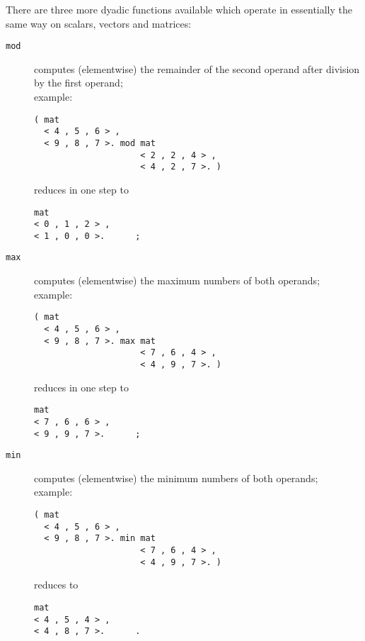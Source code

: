There are three more dyadic functions available which
operate in essentially the same 
way on scalars, vectors and matrices:
\begin{description} 
\item[{\tt mod}] computes (elementwise) the remainder of
the second operand after division by the first operand;
\\example:
\begin{verbatim}
( mat 
  < 4 , 5 , 6 > ,
  < 9 , 8 , 7 >. mod mat 
                     < 2 , 2 , 4 > ,
                     < 4 , 2 , 7 >. )
\end{verbatim}
reduces in one step to
\begin{verbatim}
mat 
< 0 , 1 , 2 > ,
< 1 , 0 , 0 >.      ;
\end{verbatim}
\item[{\tt max}] computes (elementwise) the maximum numbers
of both operands;
\\example:
\begin{verbatim}
( mat 
  < 4 , 5 , 6 > ,
  < 9 , 8 , 7 >. max mat 
                     < 7 , 6 , 4 > ,
                     < 4 , 9 , 7 >. )
\end{verbatim}
reduces in one step to
\begin{verbatim}
mat 
< 7 , 6 , 6 > ,
< 9 , 9 , 7 >.      ;
\end{verbatim}
\item[{\tt min}] computes (elementwise) the minimum numbers
of both operands;
\\example:
\begin{verbatim}
( mat 
  < 4 , 5 , 6 > ,
  < 9 , 8 , 7 >. min mat 
                     < 7 , 6 , 4 > ,
                     < 4 , 9 , 7 >. )
\end{verbatim}
reduces to
\begin{verbatim}
mat 
< 4 , 5 , 4 > ,
< 4 , 8 , 7 >.      .
\end{verbatim}
\end{description}

